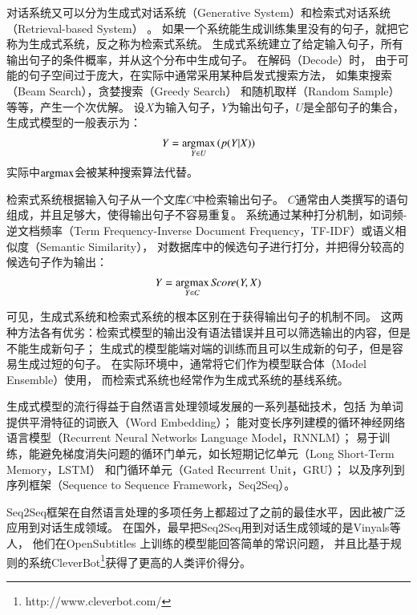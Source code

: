对话系统又可以分为生成式对话系统（Generative System）和检索式对话系统（Retrieval-based System）
。
如果一个系统能生成训练集里没有的句子，就把它称为生成式系统，反之称为检索式系统。
生成式系统建立了给定输入句子，所有输出句子的条件概率，并从这个分布中生成句子。
在解码（Decode）时，
由于可能的句子空间过于庞大，在实际中通常采用某种启发式搜索方法，
如集束搜索（Beam Search），贪婪搜索（Greedy Search）
和随机取样（Random Sample）等等，产生一个次优解。
设$X$为输入句子，$Y$为输出句子，$U$是全部句子的集合，生成式模型的一般表示为：
\begin{align}
    Y = \operatorname*{argmax}_{Y\in U} \left(p(Y|X)\right)
\end{align}
实际中$\operatorname*{argmax}$会被某种搜索算法代替。

检索式系统根据输入句子从一个文库$C$中检索输出句子。
$C$通常由人类撰写的语句组成，并且足够大，使得输出句子不容易重复。
系统通过某种打分机制，如词频-逆文档频率（Term Frequency-Inverse Document Frequency，TF-IDF）或语义相似度（Semantic Similarity），
对数据库中的候选句子进行打分，并把得分较高的候选句子作为输出：
\begin{align}
    Y = \operatorname*{argmax}_{Y\in C} \textit{Score}(Y, X)
\end{align}

可见，生成式系统和检索式系统的根本区别在于获得输出句子的机制不同。
这两种方法各有优劣：检索式模型的输出没有语法错误并且可以筛选输出的内容，但是不能生成新句子；
生成式的模型能端对端的训练而且可以生成新的句子，但是容易生成过短的句子。
在实际环境中，通常将它们作为模型联合体（Model Ensemble）使用，
而检索式系统也经常作为生成式系统的基线系统。

生成式模型的流行得益于自然语言处理领域发展的一系列基础技术，包括
为单词提供平滑特征的词嵌入（Word Embedding）；
能对变长序列建模的循环神经网络语言模型（Recurrent Neural Networks Language Model，RNNLM）；
易于训练，能避免梯度消失问题的循环门单元，如长短期记忆单元（Long Short-Term Memory，LSTM）
和门循环单元（Gated Recurrent Unit，GRU）；
以及序列到序列框架（Sequence to Sequence Framework，Seq2Seq）。

Seq2Seq框架在自然语言处理的多项任务上都超过了之前的最佳水平，因此被广泛应用到对话生成领域。
在国外，最早把Seq2Seq用到对话生成领域的是Vinyals等人，
他们在OpenSubtitles
上训练的模型能回答简单的常识问题，
并且比基于规则的系统CleverBot\footnote{http://www.cleverbot.com/}获得了更高的人类评价得分。

